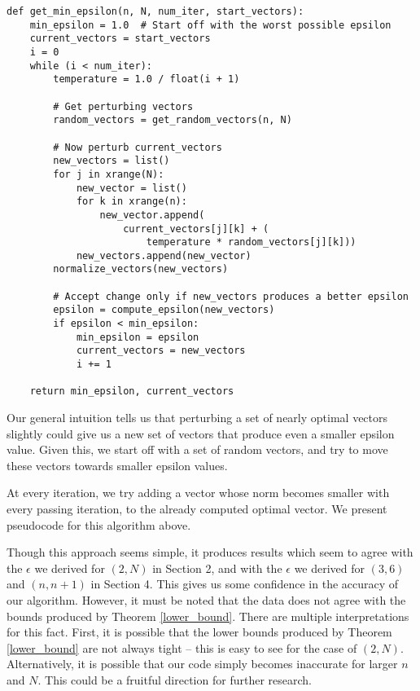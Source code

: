 \documentclass[11pt,letterpaper,twoside,english]{article}
\theoremstyle{theorem}
\theoremstyle{remark}
\begin{document}
\begin{lstlisting}
def get_min_epsilon(n, N, num_iter, start_vectors):
    min_epsilon = 1.0  # Start off with the worst possible epsilon
    current_vectors = start_vectors
    i = 0
    while (i < num_iter):
        temperature = 1.0 / float(i + 1)

        # Get perturbing vectors
        random_vectors = get_random_vectors(n, N)

        # Now perturb current_vectors
        new_vectors = list()
        for j in xrange(N):
            new_vector = list()
            for k in xrange(n):
                new_vector.append(
                    current_vectors[j][k] + (
                    	temperature * random_vectors[j][k]))
            new_vectors.append(new_vector)
        normalize_vectors(new_vectors)
        
        # Accept change only if new_vectors produces a better epsilon
        epsilon = compute_epsilon(new_vectors)
        if epsilon < min_epsilon:
            min_epsilon = epsilon
            current_vectors = new_vectors
            i += 1

    return min_epsilon, current_vectors
\end{lstlisting}

Our general intuition tells us that perturbing a set of nearly optimal vectors slightly could give us a new set of vectors that produce even a smaller epsilon value. Given this, we start off with a set of random vectors, and try to move these vectors towards smaller epsilon values.

At every iteration, we try adding a vector whose norm becomes smaller with every passing iteration, to the already computed optimal vector. We present pseudocode for this algorithm above.

Though this approach seems simple, it produces  results which seem to agree with the $\epsilon$ we derived for $(2, N)$ in Section 2, and with the $\epsilon$ we derived for $(3, 6)$ and $(n, n+1)$ in Section 4. This gives us some confidence in the accuracy of our algorithm. However, it must be noted that the data does not agree with the bounds produced by Theorem \ref{lower_bound}. There are multiple interpretations for this fact. First, it is possible that the lower bounds produced by Theorem \ref{lower_bound} are not always tight -- this is easy to see for the case of $(2, N)$. Alternatively, it is possible that our code simply becomes inaccurate for larger $n$ and $N$. This could be a fruitful direction for further research.
\end{document}
